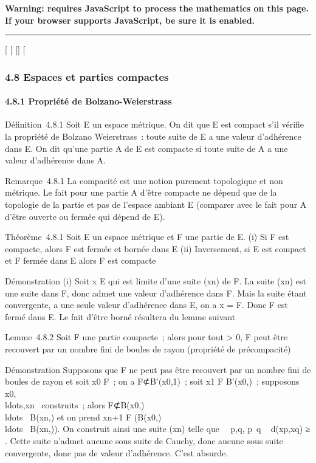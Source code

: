 \textbf{Warning: 
requires JavaScript to process the mathematics on this page.\\ If your
browser supports JavaScript, be sure it is enabled.}

\begin{center}\rule{3in}{0.4pt}\end{center}

{[}
{[}
{[}{]}
{[}

\subsubsection{4.8 Espaces et parties compactes}

\paragraph{4.8.1 Propriété de Bolzano-Weierstrass}

Définition~4.8.1 Soit E un espace métrique. On dit que E est compact
s'il vérifie la propriété de Bolzano Weierstrass~: toute suite de E a
une valeur d'adhérence dans E. On dit qu'une partie A de E est compacte
si toute suite de A a une valeur d'adhérence dans A.

Remarque~4.8.1 La compacité est une notion purement topologique et non
métrique. Le fait pour une partie A d'être compacte ne dépend que de la
topologie de la partie et pas de l'espace ambiant E (comparer avec le
fait pour A d'être ouverte ou fermée qui dépend de E).

Théorème~4.8.1 Soit E un espace métrique et F une partie de E. (i) Si F
est compacte, alors F est fermée et bornée dans E (ii) Inversement, si E
est compact et F fermée dans E alors F est compacte

Démonstration (i) Soit x \in E qui est limite d'une suite (xn)
de F. La suite (xn) est une suite dans F, donc admet une
valeur d'adhérence \ell dans F. Mais la suite étant convergente, a une
seule valeur d'adhérence dans E, on a x = \ell \in F. Donc F est fermé dans
E. Le fait d'être borné résultera du lemme suivant

Lemme~4.8.2 Soit F une partie compacte~; alors pour tout \epsilon
\textgreater{} 0, F peut être recouvert par un nombre fini de boules de
rayon \epsilon (propriété de précompacité)

Démonstration Supposons que F ne peut pas être recouvert par un nombre
fini de boules de rayon \epsilon et soit x0 \in F~; on a
F⊄B'(x0,1)~; soit x1 \in F \diagdown B'(x0,\epsilon)~;
supposons
x0,\\ldots,xn~
construits~; alors F⊄B(x0,\epsilon)
\cup\\ldots~ \cup
B(xn,\epsilon) et on prend xn+1 \in F \diagdown\left
(B(x0,\epsilon)
\cup\\ldots~ \cup
B(xn,\epsilon)\right ). On construit ainsi une suite
(xn) telle que \forall~~p,q,
p\neq~q \rigtharrow~ d(xp,xq) ≥ \epsilon. Cette
suite n'admet aucune sous suite de Cauchy, donc aucune sous suite
convergente, donc pas de valeur d'adhérence. C'est absurde.

